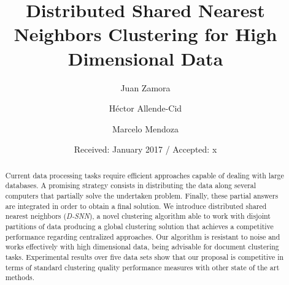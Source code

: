 \documentclass[smallextended]{svjour3}       %
\begin{document}
\title{Distributed Shared Nearest Neighbors Clustering for High Dimensional Data}

\author{Juan Zamora         \and
        H\'ector Allende-Cid \and 
        Marcelo Mendoza
}



\date{Received: January 2017 / Accepted: x}

\maketitle

\begin{abstract}
Current data processing tasks require efficient approaches capable of dealing with large databases. A promising strategy consists in distributing the data along several computers that partially solve the undertaken problem. Finally, these partial answers are integrated in order to obtain a final solution. We introduce distributed shared nearest neighbors (\textit{D-SNN}), a novel clustering algorithm able to work with disjoint partitions of data producing a global clustering solution that achieves a competitive performance regarding centralized approaches. Our algorithm is resistant to noise and works effectively with high dimensional data, being advisable for document clustering tasks. Experimental results over five data sets show that our proposal is competitive in terms of standard clustering quality performance measures with other state of the art methods. 
\end{abstract}
\end{document}
